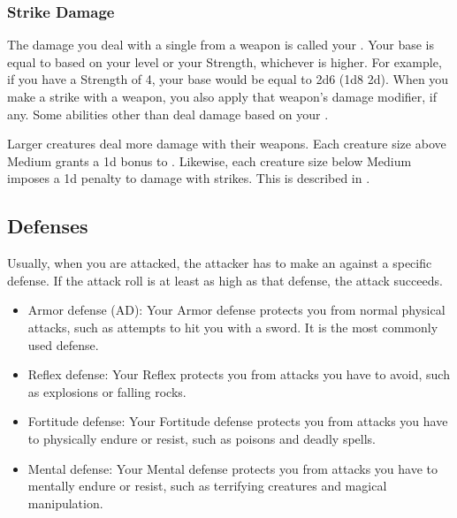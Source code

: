         \subsubsection{Strike Damage}\label{Strike Damage}
            The damage you deal with a single  from a weapon is called your .
            Your base  is equal to  based on your level or your Strength, whichever is higher.
            For example, if you have a Strength of 4, your base  would be equal to 2d6 (1d8 \plus2d).
            When you make a strike with a weapon, you also apply that weapon's damage modifier, if any.
            Some abilities other than  deal damage based on your .

            \label{Creature Size and Damage}
            Larger creatures deal more damage with their weapons.
            Each creature size above Medium grants a \plus1d bonus to .
            Likewise, each creature size below Medium imposes a \minus1d penalty to damage with strikes.
            This is described in .

    \subsection{Defenses}\label{Defenses}
        Usually, when you are attacked, the attacker has to make an  against a specific defense.
        If the attack roll is at least as high as that defense, the attack succeeds.
        \begin{itemize}
            \item Armor defense (AD): Your Armor defense protects you from normal physical attacks, such as attempts to hit you with a sword.
                It is the most commonly used defense.
            \item Reflex defense: Your Reflex protects you from attacks you have to avoid, such as explosions or falling rocks.
            \item Fortitude defense: Your Fortitude defense protects you from attacks you have to physically endure or resist, such as poisons and deadly spells.
            \item Mental defense: Your Mental defense protects you from attacks you have to mentally endure or resist, such as terrifying creatures and magical manipulation.
        \end{itemize}

